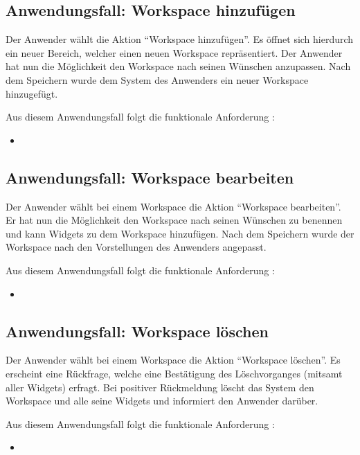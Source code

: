 \subsection{Anwendungsfall: Workspace hinzufügen}
Der Anwender wählt die Aktion "`Workspace hinzufügen"'. Es öffnet sich hierdurch ein neuer Bereich, welcher einen neuen Workspace repräsentiert. Der Anwender hat nun die Möglichkeit den Workspace nach seinen Wünschen anzupassen. Nach dem Speichern wurde dem System des Anwenders ein neuer Workspace hinzugefügt.
 
Aus diesem Anwendungsfall folgt die funktionale Anforderung :
\begin{itemize}
 \item \requirementf{\requirementWorkspaceAdd}\label{requirementWorkspaceAdd}
\end{itemize}
 
\subsection{Anwendungsfall: Workspace bearbeiten}
Der Anwender wählt bei einem Workspace die Aktion "`Workspace bearbeiten"'. Er hat nun die Möglichkeit den Workspace nach seinen Wünschen zu benennen und kann Widgets zu dem Workspace hinzufügen. Nach dem Speichern wurde der Workspace nach den Vorstellungen des Anwenders angepasst.

Aus diesem Anwendungsfall folgt die funktionale Anforderung :
\begin{itemize}
 \item \requirementf{\requirementWorkspaceEdit}\label{requirementWorkspaceEdit}
\end{itemize}
 
\subsection{Anwendungsfall: Workspace löschen}
Der Anwender wählt bei einem Workspace die Aktion "`Workspace löschen"'. Es erscheint eine Rückfrage, welche eine Bestätigung des Löschvorganges (mitsamt aller Widgets) erfragt. Bei positiver Rückmeldung löscht das System den Workspace und alle seine Widgets und informiert den Anwender darüber.
 
Aus diesem Anwendungsfall folgt die funktionale Anforderung :
\begin{itemize}
 \item \requirementf{\requirementWorkspaceDelete}\label{requirementWorkspaceDelete}
\end{itemize}

